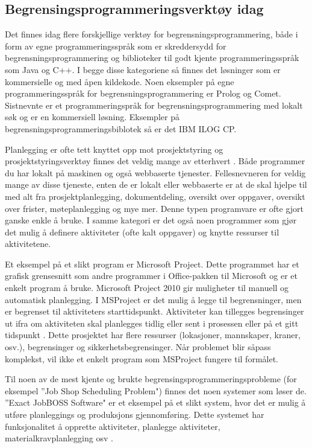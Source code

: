 \subsection{Begrensingsprogrammeringsverktøy idag}
Det finnes idag flere forskjellige verktøy for begrensningsprogrammering, både i form av egne programmeringsspråk som er skreddersydd for begrensningsprogrammering og biblioteker til godt kjente programmeringsspråk som Java og C++. I begge disse kategoriene så finnes det løsninger som er kommersielle og med åpen kildekode. Noen eksempler på egne programmeringsspråk for begrensningsprogrammering er Prolog og Comet. Sistnevnte er et programmeringspråk for begrensningsprogrammering med lokalt søk og er en kommersiell løsning. Eksempler på begrensningsprogrammeringsbiblotek så er det IBM ILOG CP.

Planlegging er ofte tett knyttet opp mot prosjektstyring og prosjektstyringsverktøy finnes det veldig mange av etterhvert \cite{projectmanagmenttoolswiki}. Både programmer du har lokalt på maskinen og også webbaserte tjenester. Fellesnevneren for veldig mange av disse tjeneste, enten de er lokalt eller webbaserte er at de skal hjelpe til med alt fra prosjektplanlegging, dokumentdeling, oversikt over oppgaver, oversikt over frister, møteplanlegging og mye mer. Denne typen programvare er ofte gjort ganske enkle å bruke. I samme kategori er det også noen programmer som gjør det mulig å definere aktiviteter (ofte kalt oppgaver) og knytte ressurser til aktivitetene.

Et eksempel på et slikt program er Microsoft Project. Dette programmet har et grafisk grensesnitt som andre programmer i Office-pakken til Microsoft og er et enkelt program å bruke. Microsoft Project 2010 gir muligheter til manuell og automatisk planlegging\cite{msproject2010blog}. I MSProject er det mulig å legge til begrensninger, men er begrenset til aktiviteters starttidspunkt. Aktiviteter kan tillegges begrensinger ut ifra om aktiviteten skal planlegges tidlig eller sent i prosessen eller på et gitt tidspunkt \cite{begrensingermsproject}. Dette prosjektet har flere ressurser (lokasjoner, mannskaper, kraner, osv.), begrensinger og sikkerhetsbegrensinger. Når problemet blir såpass komplekst, vil ikke et enkelt program som MSProject fungere til formålet.

Til noen av de mest kjente og brukte begrensingsprogrammeringsprobleme (for eksempel ''Job Shop Scheduling Problem") finnes det noen systemer som løser de. ''Exact JobBOSS Software" er et eksempel på et slikt system, hvor det er mulig å utføre planleggings og produksjons gjennomføring. Dette systemet har funksjonalitet å opprette aktiviteter, planlegge aktiviteter, materialkravplanlegging osv \cite{exact}.

